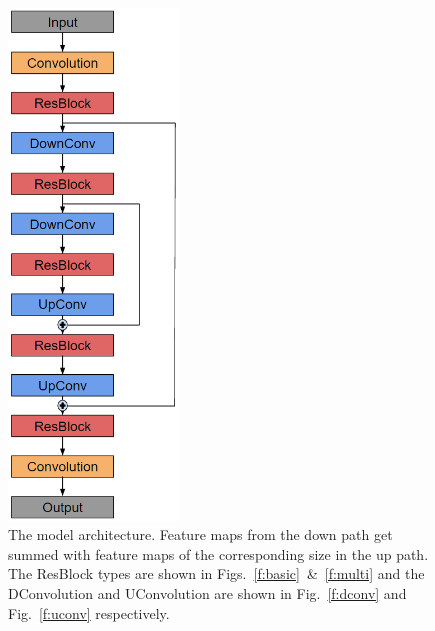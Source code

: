 \begin{figure}[h!]
	\centering
		\includegraphics[width=0.4\textwidth]{figures/mymodel.png}
	\caption{The model architecture. Feature maps from the down path get summed with feature maps of the corresponding size in the up path. The ResBlock types are shown in Figs.~\ref{f:basic}~\&~\ref{f:multi} and the DConvolution and UConvolution are shown in Fig.~\ref{f:dconv} and Fig.~\ref{f:uconv} respectively.}
	\label{f:model}
\end{figure}
